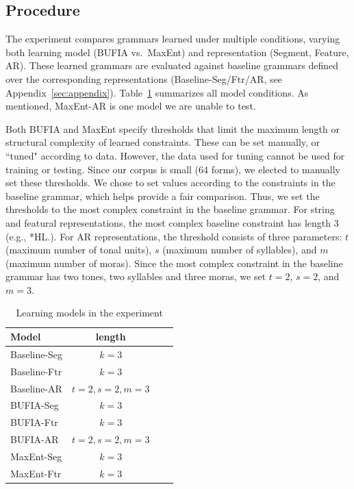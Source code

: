 
\subsection{Procedure}

The experiment compares grammars learned under multiple conditions,
varying both learning model (BUFIA vs.\ MaxEnt) and
representation (Segment, Feature, AR).
These learned grammars are evaluated against baseline grammars defined over the
corresponding representations (Baseline-Seg/Ftr/AR, see Appendix~\ref{sec:appendix}).
Table~\ref{tab.all.models} summarizes all model conditions.
As mentioned, MaxEnt-AR is one model we are unable to test.

Both BUFIA and MaxEnt specify thresholds that limit the maximum length
or structural complexity of learned constraints.
These can be set manually, or ``tuned" according to data.
However, the data used for tuning cannot be used for training or testing.
Since our corpus is small (64 forms), we elected to manually set these
thresholds.
We chose to set values according to the constraints in the baseline grammar,
which helps provide a fair comparison. Thus, we set the thresholds to the 
most complex constraint in the baseline grammar.
For string and featural representations,
the most complex baseline constraint has length 3 (e.g., *HL.).
For AR representations, the threshold consists of three parameters:
$t$ (maximum number of tonal units), $s$ (maximum number of syllables), and
$m$ (maximum number of moras).
Since the most complex constraint in the baseline grammar has two tones, two
syllables and three moras,
we set $t=2$, $s=2$, and $m=3$.

\begin{table}[t]
\centering
	\begin{tabular}{lccc}
	\toprule
		Model        & length              \\
	\midrule
		Baseline-Seg & $ k =3 $            \\
		Baseline-Ftr & $ k =3 $            \\
		Baseline-AR  & $t = 2, s = 2, m=3$ \\
	\midrule
		BUFIA-Seg    & $ k =3 $            \\
		BUFIA-Ftr    & $ k =3 $            \\
		BUFIA-AR     & $t = 2,s = 2, m=3$  \\
	\midrule
		MaxEnt-Seg   & $ k =3 $            \\
		MaxEnt-Ftr   & $ k =3 $            \\
	\bottomrule
	\end{tabular}
\caption{Learning models in the experiment}
\label{tab.all.models}
\end{table}

